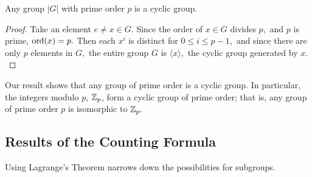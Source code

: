 \begin{corollary}
Any group $|G|$ with prime order $p$ is a cyclic group. 
\end{corollary}
\begin{proof}
Take an element $e \neq x \in G.$ Since the order of $x \in G$ divides $p,$ and $p$ is prime, $\operatorname{ord}(x) = p.$ Then each $x^i$ is distinct for $0 \leq i \leq p-1,$ and since there are only $p$ elements in $G,$ the entire group $G$ is $\langle x \rangle,$ the cyclic group generated by $x.$
\end{proof}

Our result shows that any group of prime order is a cyclic group. In particular, the integers modulo $p$, $\mathbb Z_p$, form a cyclic group of prime order; that is, any group of prime order $p$ is isomorphic to $\mathbb Z_p.$ 

\subsection{Results of the Counting Formula}
Using Lagrange's Theorem narrows down the possibilities for subgroups. 
